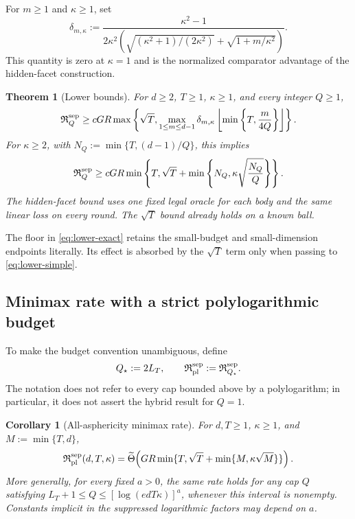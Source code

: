 \documentclass[11pt]{article}
\newcommand{\wtTheta}{\widetilde\Theta}
\newtheorem{theorem}{Theorem}[section]
\newtheorem{corollary}[corollary]{Corollary}
\theoremstyle{definition}
\begin{document}
For $m\ge1$ and $\kappa\ge1$, set
\begin{equation}\label{eq:delta}
 \delta_{m,\kappa}:=
 \frac{\kappa^2-1}
 {2\kappa^2\left(
 \sqrt{(\kappa^2+1)/(2\kappa^2)}+\sqrt{1+m/\kappa^2}
 \right)}.
\end{equation}
This quantity is zero at $\kappa=1$ and is the normalized comparator
advantage of the hidden-facet construction.

\begin{theorem}[Lower bounds]\label{thm:lower}
For $d\ge2$, $T\ge1$, $\kappa\ge1$, and every integer $Q\ge1$,
\begin{equation}\label{eq:lower-exact}
 \mathfrak R_Q^{\rm sep}
 \ge cGR\max\left\{\sqrt T,
 \max_{1\le m\le d-1}
 \delta_{m,\kappa}
 \left\lfloor\min\left\{T,\frac{m}{4Q}\right\}\right\rfloor
 \right\}.
\end{equation}
For $\kappa\ge2$, with $N_Q:=\min\{T,(d-1)/Q\}$, this implies
\begin{equation}\label{eq:lower-simple}
 \mathfrak R_Q^{\rm sep}
 \ge cGR\min\left\{T,
 \sqrt T+\min\left\{N_Q,\kappa\sqrt{\frac{N_Q}{Q}}\right\}
 \right\}.
\end{equation}
The hidden-facet bound uses one fixed legal oracle for each body and the
same linear loss on every round. The $\sqrt T$ bound already holds on a
known ball.
\end{theorem}

The floor in \eqref{eq:lower-exact} retains the small-budget and
small-dimension endpoints literally. Its effect is absorbed by the
$\sqrt T$ term only when passing to \eqref{eq:lower-simple}.

\subsection{Minimax rate with a strict polylogarithmic budget}

To make the budget convention unambiguous, define
\begin{equation}\label{eq:pldef}
 Q_\star:=2L_T,
 \qquad
 \mathfrak R_{\rm pl}^{\rm sep}:=\mathfrak R_{Q_\star}^{\rm sep}.
\end{equation}
The notation does not refer to every cap bounded above by a polylogarithm;
in particular, it does not assert the hybrid result for $Q=1$.

\begin{corollary}[All-asphericity minimax rate]\label{cor:main}
For $d,T\ge1$, $\kappa\ge1$, and $M:=\min\{T,d\}$,
\begin{equation}\label{eq:main}
 \mathfrak R_{\rm pl}^{\rm sep}(d,T,\kappa)
 =\wtTheta\!\left(
 GR\min\{T,\sqrt T+\min\{M,\kappa\sqrt M\}\}
 \right).
\end{equation}
More generally, for every fixed $a>0$, the same rate holds for any cap
$Q$ satisfying
$L_T+1\le Q\le[\log(edT\kappa)]^a$, whenever this interval is nonempty.
Constants implicit in the suppressed logarithmic factors may depend on $a$.
\end{corollary}
\end{document}
